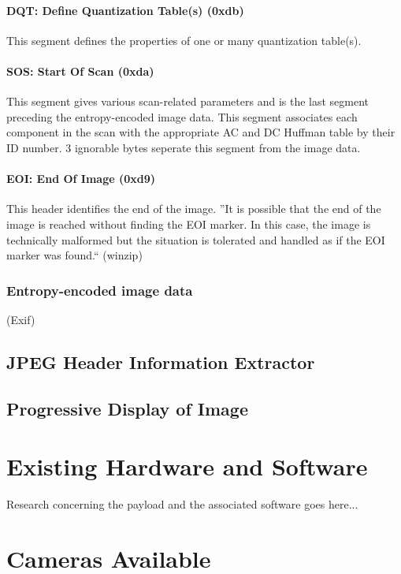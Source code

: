 \documentclass[oneside]{ecsgdp}         %
\begin{document}
\paragraph*{DQT: Define Quantization Table(s) (0xdb)}
This segment defines the properties of one or many quantization table(s).

\paragraph*{SOS: Start Of Scan (0xda)}
This segment gives various scan-related parameters and is the last segment preceding the entropy-encoded image data. This segment associates each component in the scan with the appropriate AC and DC Huffman table by their ID number. 3 ignorable bytes seperate this segment from the image data. 

\paragraph*{EOI: End Of Image (0xd9)}
This header identifies the end of the image. ''It is possible that the end of the image is reached without finding the EOI marker. In this case, the image is technically malformed but the situation is tolerated and handled as if the EOI marker was found.`` (winzip) 

\subsubsection{Entropy-encoded image data}
(Exif)

\subsection{JPEG Header Information Extractor}

\subsection{Progressive Display of Image}

\section{Existing Hardware and Software}
Research concerning the payload and the associated software goes here...

\section{Cameras Available}
\end{document}
